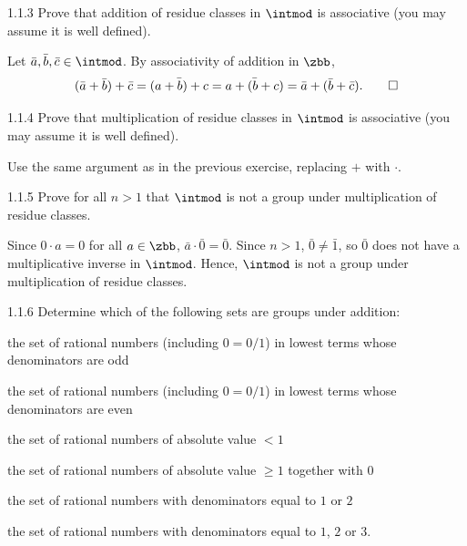 \begin{exercise}{1.1.3}
    Prove that addition of residue classes in $\intmod$ is associative (you may assume it is well defined).
\end{exercise}

\begin{sol}
    Let $\bar a, \bar b, \bar c \in \intmod$.
	By associativity of addition in $\zbb$,
    \[
    	(\bar a + \bar b) + \bar c = \bar{(a + b) + c} = \bar{a + (b + c)} = \bar a + (\bar b + \bar c). \qedhere
    \]
\end{sol}

\begin{exercise}{1.1.4}
    Prove that multiplication of residue classes in $\intmod$ is associative (you may assume it is well defined).
\end{exercise}

\begin{sol}
    Use the same argument as in the previous exercise, replacing $+$ with $\cdot$.
\end{sol}

\begin{exercise}{1.1.5}
    Prove for all $n > 1$ that $\intmod$ is not a group under multiplication of residue classes.
\end{exercise}

\begin{sol}
    Since $0 \cdot a = 0$ for all $a \in \zbb$, $\bar a \cdot \bar 0 = \bar 0$.
	Since $n > 1$, $\bar 0 \neq \bar 1$, so $\bar 0$ does not have a multiplicative inverse in $\intmod$.
	Hence, $\intmod$ is not a group under multiplication of residue classes.
\end{sol}

\begin{exercise}{1.1.6}
    Determine which of the following sets are groups under addition:
    \begin{subexercises}
        \item the set of rational numbers (including $0 = 0/1$) in lowest terms whose denominators are odd
        \item the set of rational numbers (including $0 = 0/1$) in lowest terms whose denominators are even
        \item the set of rational numbers of absolute value $< 1$
        \item the set of rational numbers of absolute value $\geq 1$ together with $0$
        \item the set of rational numbers with denominators equal to $1$ or $2$
        \item the set of rational numbers with denominators equal to $1$, $2$ or $3$.
    \end{subexercises}
\end{exercise}

